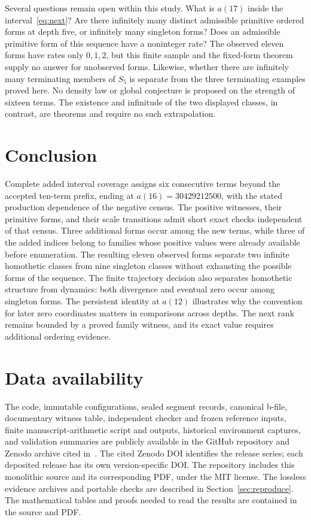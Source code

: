 \documentclass[11pt,a4paper]{article}
\theoremstyle{definition}
\theoremstyle{remark}
\begin{document}
Several questions remain open within this study. What is $a(17)$ inside
the interval~\eqref{eq:next}? Are there infinitely many distinct admissible
primitive ordered forms at depth five, or infinitely many singleton
forms? Does an admissible primitive form of this sequence have a noninteger
rate? The observed eleven forms have rates only $0,1,2$, but this finite
sample and the fixed-form theorem supply no answer for unobserved forms.
Likewise, whether there are infinitely many terminating members of $S_5$
is separate from the three terminating examples proved here. No density
law or global conjecture is proposed on the strength of sixteen terms.
The existence and infinitude of the two displayed classes, in contrast,
are theorems and require no such extrapolation.

\section{Conclusion}\label{sec:conclusion}

Complete added interval coverage assigns six consecutive terms beyond the
accepted ten-term prefix, ending at $a(16)=30429212500$, with the stated
production dependence of the negative census. The positive witnesses,
their primitive forms, and their scale transitions admit short exact
checks independent of that census. Three additional forms occur among
the new terms, while three of the added indices belong to families whose
positive values were already available before enumeration. The resulting
eleven observed forms separate two infinite homothetic classes from nine
singleton classes without exhausting the possible forms of the sequence.
The finite trajectory decision also separates homothetic structure from
dynamics: both divergence and eventual zero occur among singleton forms.
The persistent identity at $a(12)$ illustrates why the convention for
later zero coordinates matters in comparisons across depths. The next
rank remains bounded by a proved family witness, and its exact value
requires additional ordering evidence.

\section*{Data availability}
The code, immutable configurations, sealed segment records, canonical b-file,
documentary witness table, independent checker and frozen reference inputs,
finite manuscript-arithmetic script and outputs, historical environment
captures, and validation summaries are publicly available in the GitHub
repository and Zenodo archive cited in~\cite{project}.
The cited Zenodo DOI identifies the release series; each deposited release
has its own version-specific DOI. The repository includes this monolithic
source and its corresponding PDF, under the MIT license.
The lossless evidence archives and portable checks are described in
Section~\ref{sec:reproduce}. The mathematical tables and proofs needed to
read the results are contained in the source and PDF.
\end{document}
